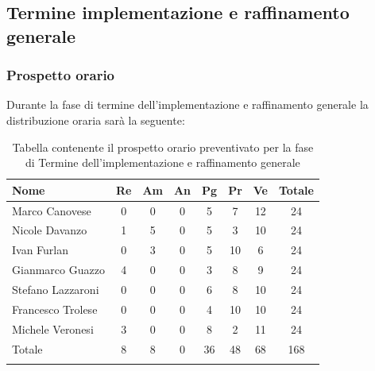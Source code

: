 \subsection{Termine implementazione e raffinamento generale}
\subsubsection{Prospetto orario}
Durante la fase di termine dell'implementazione e raffinamento generale la distribuzione oraria sarà la seguente:

\begin{longtable}{|l|c|c|c|c|c|c|c|}
	\hline
	\rowcolor{lighter-grayer}
	\textbf{Nome}     & \textbf{Re} & \textbf{Am} & \textbf{An} & \textbf{Pg} & \textbf{Pr} & \textbf{Ve} & \textbf{Totale} \\
	\hline
	\endfirsthead

	\hline
	Marco Canovese    & 0           & 0           & 0           & 5           & 7           & 12          & 24              \\
	\hline
	\hline
	Nicole Davanzo    & 1           & 5           & 0           & 5           & 3           & 10          & 24              \\
	\hline
	\hline
	Ivan Furlan       & 0           & 3           & 0           & 5           & 10          & 6           & 24              \\
	\hline
	\hline
	Gianmarco Guazzo  & 4           & 0           & 0           & 3           & 8           & 9           & 24              \\
	\hline
	\hline
	Stefano Lazzaroni & 0           & 0           & 0           & 6           & 8           & 10          & 24              \\
	\hline
	\hline
	Francesco Trolese & 0           & 0           & 0           & 4           & 10          & 10          & 24              \\
	\hline
	\hline
	Michele Veronesi  & 3           & 0           & 0           & 8           & 2           & 11          & 24              \\
	\hline
	\hline
	Totale            & 8           & 8           & 0           & 36          & 48          & 68          & 168             \\
	\hline
	\rowcolor{white}
	\caption{Tabella contenente il prospetto orario preventivato per la fase di Termine dell'implementazione e raffinamento generale}
\end{longtable}


